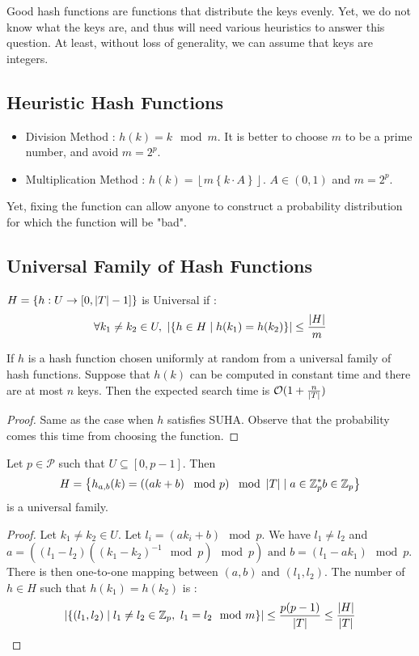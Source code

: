 \documentclass[12pt]{cours}
\begin{document}
Good hash functions are functions that distribute the keys evenly. Yet, we do not know what the keys are, and thus will need various heuristics to answer this question. At least, without loss of generality, we can assume that keys are integers.

\subsection{Heuristic Hash Functions}
\begin{itemize}
    \item Division Method : $h(k) = k \mod m$. It is better to choose $m$ to be a prime number, and avoid $m = 2^{p}$.
    \item Multiplication Method : $h(k) = \left\lfloor m \left\{k\cdot A\right\}\right\rfloor$. $A \in (0, 1)$ and $m = 2^{p}$.
\end{itemize}
Yet, fixing the function can allow anyone to construct a probability distribution for which the function will be "bad".

\subsection{Universal Family of Hash Functions}
$H = \left\{h : U \rightarrow \left[0, \left|T\right|-1\right]\right\}$ is Universal if :
\[
    \forall k_{1} \neq k_{2} \in U, \ \left|\left\{h \in H \mid h(k_{1}) = h(k_{2})\right\}\right| \leq \frac{\left|H\right|}{m}
\]
\begin{theorem}
    If $h$ is a hash function chosen uniformly at random from a universal family of hash functions. Suppose that $h(k)$ can be computed in constant time and there are at most $n$ keys. Then the expected search time is $\mathcal{O}(1 + \frac{n}{\left|T\right|})$
\end{theorem}
\begin{proof}
    Same as the case when $h$ satisfies SUHA. Observe that the probability comes this time from choosing the function.
\end{proof}

\begin{theorem}
    Let $p \in \mathcal{P}$ such that $U \subseteq \left[0, p-1\right]$. Then \[H = \left\{h_{a, b}(k) = \left(\left(ak + b\right) \mod p\right) \mod \abs{T} \mid a \in \Z_{p}^{*} b \in \Z_{p} \right\}\] is a universal family.
\end{theorem}
\begin{proof}
    Let $k_{1} \neq k_{2} \in U$. Let $l_{i} = (ak_{i} + b) \mod p$. We have $l_{1} \neq l_{2}$ and $ a = ((l_{1} - l_{2})((k_{1}-k_{2})^{-1} \mod p) \mod p) \text{ and } b = (l_{1} - ak_{1}) \mod p$. There is then one-to-one mapping between $(a, b)$ and $(l_{1}, l_{2})$. The number of $h \in H$ such that $h(k_{1}) = h(k_{2})$ is :
    \[
        \left|\left\{(l_{1}, l_{2})\mid l_{1} \neq l_{2} \in \mathbb{Z}_{p}, \ l_{1} = l_{2} \mod m \right\}\right| \leq \frac{p(p-1)}{\left|T\right|} \leq \frac{\left|H\right|}{\left|T\right|}
    \]
\end{proof}
\end{document}
